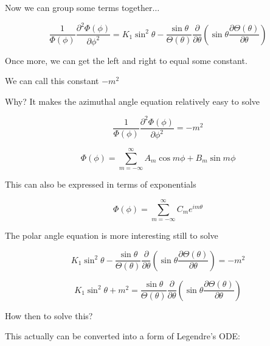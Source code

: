 \documentclass[12pt]{article}
\renewcommand{\_}{\kern-1.5pt\textunderscore\kern-1.5pt}
\begin{document}
Now we can group some terms together$ \ldots $ \par

 \[ \frac{1}{ \Phi  \left(  \phi  \right) }\frac{ \partial ^{2} \Phi  \left(  \phi  \right) }{ \partial  \phi ^{2}}=K_{1}\sin ^{2} \theta -\frac{\sin  \theta }{ \Theta  \left(  \theta  \right) }\frac{ \partial }{ \partial  \theta } \left( \sin  \theta \frac{ \partial  \Theta  \left(  \theta  \right) }{ \partial  \theta } \right)  \] \par

Once more, we can get the left and right to equal some constant.\par

We can call this constant  \( -m^{2} \) \par

Why? It makes the azimuthal angle equation relatively easy to solve\par

 \[ \frac{1}{ \Phi  \left(  \phi  \right) }\frac{ \partial ^{2} \Phi  \left(  \phi  \right) }{ \partial  \phi ^{2}}=-m^{2} \] \par

 \[  \Phi  \left(  \phi  \right) = \sum _{m=-\infty}^{\infty}A_{m}\cos m \phi +B_{m}\sin m \phi  \] \par

This can also be expressed in terms of exponentials\par

 \[  \Phi  \left(  \phi  \right) = \sum _{m=-\infty}^{\infty}C_{m}e^{im \theta } \] \par

The polar angle equation is more interesting still to solve\par

 \[ K_{1}\sin ^{2} \theta -\frac{\sin  \theta }{ \Theta  \left(  \theta  \right) }\frac{ \partial }{ \partial  \theta } \left( \sin  \theta \frac{ \partial  \Theta  \left(  \theta  \right) }{ \partial  \theta } \right) =-m^{2} \] \par

 \[ K_{1}\sin ^{2} \theta +m^{2}=\frac{\sin  \theta }{ \Theta  \left(  \theta  \right) }\frac{ \partial }{ \partial  \theta } \left( \sin  \theta \frac{ \partial  \Theta  \left(  \theta  \right) }{ \partial  \theta } \right)  \] \par

How then to solve this?\par

This actually can be converted into a form of Legendre’s ODE:\par
\end{document}

